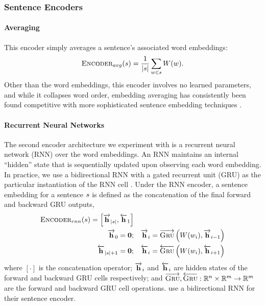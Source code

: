
\subsubsection{Sentence Encoders}
\paragraph{Averaging} This encoder simply averages a sentence's
associated word embeddings:
\[ \textsc{Encoder}_{avg}(s) = \frac{1}{|s|} \sum_{w \in s} W(w). \]
Other than the word embeddings, this encoder involves no learned parameters,
and while it collapses word order, embedding averaging has consistently
been found competitive with more sophisticated sentence embedding techniques
\citep{iyyer2015deep,wieting2015towards,arora2016simple,wieting2017revisiting}.


\paragraph{Recurrent Neural Networks} The second encoder architecture
we experiment with is a recurrent neural network (RNN) over the word
embeddings. An RNN maintains an internal ``hidden'' state that is sequentially
updated upon observing each word embedding. In practice, we use a bidirectional
RNN with a gated recurrent unit (GRU) as the particular instantiation of 
the RNN cell \citep{cho2014learning}.
Under the RNN encoder, a sentence embedding for a sentence $s$ is defined 
as the concatenation of the final forward and backward GRU outputs,
\begin{align}
\textsc{Encoder}_{rnn}(s) = \Big[\overrightarrow{\mathbf{h}}_{|s|}, \overleftarrow{\mathbf{h}}_{1} \Big] & \\
  \overrightarrow{\mathbf{h}}_0 = \mathbf{0};& \quad 
  \overrightarrow{\mathbf{h}}_i = \overrightarrow{\textsc{Gru}}\left(W(w_i), \overrightarrow{\mathbf{h}}_{i-1}\right) \\
  \overleftarrow{\mathbf{h}}_{|s| + 1} = \mathbf{0};& \quad 
  \overleftarrow{\mathbf{h}}_i = \overleftarrow{\textsc{Gru}}\left(W(w_i), \overleftarrow{\mathbf{h}}_{i+1}\right) 
\end{align}
where $[\cdot]$ is the concatenation operator; $\overrightarrow{\mathbf{h}}_i$ and $\overleftarrow{\mathbf{h}}_i$ are
hidden states of the forward and backward GRU cells respectively; and 
$\overrightarrow{\textsc{Gru}}, \overleftarrow{\textsc{Gru}} : \mathbb{R}^n \times \mathbb{R}^m 
\rightarrow \mathbb{R}^m$ are the forward and backward GRU cell 
operations.
\cite{nallapati2016summarunner} use a bidirectional RNN for their sentence
encoder.

